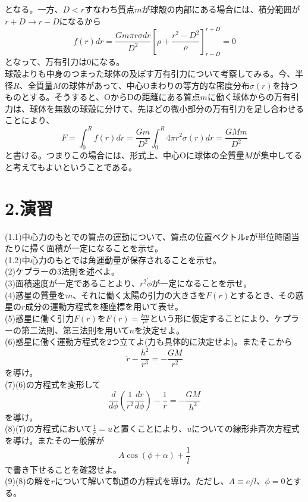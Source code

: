 \documentclass{jsarticle}
\begin{document}
となる。一方、\(D<r\)すなわち質点\(m\)が球殻の内部にある場合には、積分範囲が\(r+D\to r-D\)になるから
\[f(r)dr=\frac{Gm\pi r\sigma dr}{D^2}\left[\rho+\frac{r^2-D^2}{\rho}\right]_{r-D}^{r+D}=0\]
となって、万有引力は0になる。\\
球殻よりも中身のつまった球体の及ぼす万有引力について考察してみる。今、半径\(R\)、全質量\(M\)の球体があって、中心Oまわりの等方的な密度分布\(\sigma(r)\)を持つものとする。そうすると、OからDの距離にある質点\(m\)に働く球体からの万有引力は、球体を無数の球殻に分けて、先ほどの微小部分の万有引力を足し合わせることにより、
\[F=\int_{0}^{R}f(r)dr=\frac{Gm}{D^2}\int_{0}^{R}4\pi r^2\sigma(r)dr=\frac{GMm}{D^2}\]
と書ける。つまりこの場合には、形式上、中心Oに球体の全質量\(M\)が集中してると考えてもよいということである。\\
\section*{2.演習}
\noindent
(1.1)中心力のもとでの質点の運動について、質点の位置ベクトル\(\bm{r}\)が単位時間当たりに掃く面積が一定になることを示せ。\\
(1.2)中心力のもとでは角運動量が保存されることを示せ。\\
(2)ケプラーの3法則を述べよ。\\
(3)面積速度が一定であることより、\(r^2\dot{\phi}\)が一定になることを示せ。\\
(4)惑星の質量を\(m\)、それに働く太陽の引力の大きさを\(F(r)\)とするとき、その惑星の\(r\)成分の運動方程式を極座標を用いて表せ。\\
(5)惑星に働く引力\(F(r)\)を\(\displaystyle F(r)=\frac{km}{r^{n}}\)という形に仮定することにより、ケプラーの第二法則、第三法則を用いて\(n\)を決定せよ。\\
(6)惑星に働く運動方程式を2つ立てよ(力も具体的に決定せよ)。またそこから
\[\ddot{r}-\frac{h^2}{r^3}=-\frac{GM}{r^2}\]
を導け。\\
(7)\hspace{3mm}(6)の方程式を変形して
\[\frac{d}{d\phi}\left(\frac{1}{r^2}\frac{dr}{d\phi}\right)-\frac{1}{r}=-\frac{GM}{h^2}\]
を導け。\\
(8)\hspace{3mm}(7)の方程式において\(\frac{1}{r}=u\)と置くことにより、\(u\)についての線形非斉次方程式を導け。またその一般解が
\[A\cos(\phi+\alpha)+\frac{1}{l}\]
で書き下せることを確認せよ。\\
(9)\hspace{3mm}(8)の解を\(r\)について解いて軌道の方程式を導け。ただし、\(A\equiv e/l\)、\(\phi=0\)とする。\\
\end{document}
